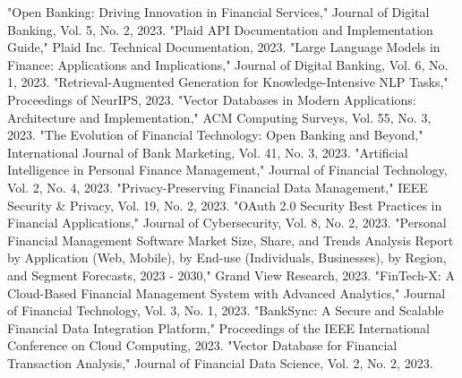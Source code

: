 \documentclass[conference]{IEEEtran}
\begin{document}
\begin{thebibliography}{00}
 "Open Banking: Driving Innovation in Financial Services," Journal of Digital Banking, Vol. 5, No. 2, 2023.
 "Plaid API Documentation and Implementation Guide," Plaid Inc. Technical Documentation, 2023.
 "Large Language Models in Finance: Applications and Implications," Journal of Digital Banking, Vol. 6, No. 1, 2023.
 "Retrieval-Augmented Generation for Knowledge-Intensive NLP Tasks," Proceedings of NeurIPS, 2023.
 "Vector Databases in Modern Applications: Architecture and Implementation," ACM Computing Surveys, Vol. 55, No. 3, 2023.
 "The Evolution of Financial Technology: Open Banking and Beyond," International Journal of Bank Marketing, Vol. 41, No. 3, 2023.
 "Artificial Intelligence in Personal Finance Management," Journal of Financial Technology, Vol. 2, No. 4, 2023.
 "Privacy-Preserving Financial Data Management," IEEE Security & Privacy, Vol. 19, No. 2, 2023.
 "OAuth 2.0 Security Best Practices in Financial Applications," Journal of Cybersecurity, Vol. 8, No. 2, 2023.
 "Personal Financial Management Software Market Size, Share, and Trends Analysis Report by Application (Web, Mobile), by End-use (Individuals, Businesses), by Region, and Segment Forecasts, 2023 - 2030," Grand View Research, 2023.
 "FinTech-X: A Cloud-Based Financial Management System with Advanced Analytics," Journal of Financial Technology, Vol. 3, No. 1, 2023.
 "BankSync: A Secure and Scalable Financial Data Integration Platform," Proceedings of the IEEE International Conference on Cloud Computing, 2023.
 "Vector Database for Financial Transaction Analysis," Journal of Financial Data Science, Vol. 2, No. 2, 2023.
\end{thebibliography}
\end{document}
